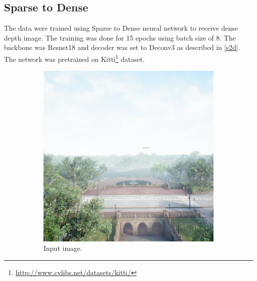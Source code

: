 \documentclass[twoside]{ctuthesis}
\theoremstyle{plain}
\theoremstyle{definition}
\theoremstyle{note}
\begin{document}
\subsection{Sparse to Dense}
The data were trained using Sparse to Dense neural network to receive dense depth image. The training was done for 15 epochs using batch size of 8. The backbone was Resnet18 and decoder was set to Deconv3 as described in \autoref{s2d}. The network was pretrained on Kitti\footnote{\url{http://www.cvlibs.net/datasets/kitti/}} dataset.
\begin{figure}
	\centering
	\begin{subfigure}[b]{0.4\textwidth}
		\centering
		\includegraphics[width=\textwidth]{s2d_input.png}
		\caption{Input image.}
	\end{subfigure}
	\hfill
	\begin{subfigure}[b]{0.4\textwidth}
		\centering

\end{subfigure}
\end{figure}
\end{document}
